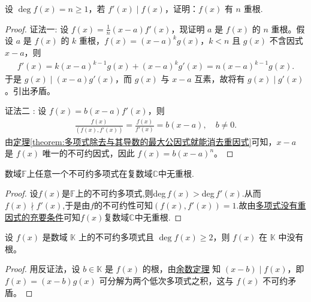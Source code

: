 \documentclass[../../main.tex]{subfiles}%
\begin{document}
\begin{proposition}\label{proposition:f有n重根的判断条件}
设 $\deg f(x) = n \geqslant  1$，若 $f'(x) \mid f(x)$，证明：$f(x)$ 有 $n$ 重根.
\end{proposition}
\begin{proof}

{\color{blue}证法一:}
设 $f(x) = \frac{1}{n}(x - a)f'(x)$，现证明 $a$ 是 $f(x)$ 的 $n$ 重根。假设 $a$ 是 $f(x)$ 的 $k$ 重根，$f(x) = (x - a)^k g(x)$，$k < n$ 且 $g(x)$ 不含因式 $x - a$，则
\begin{align*}
f'(x) = k(x - a)^{k-1}g(x) + (x - a)^k g'(x) = n(x - a)^{k-1}g(x).
\end{align*}
于是 $g(x) \mid (x - a)g'(x)$，而 $g(x)$ 与 $x - a$ 互素，故将有 $g(x) \mid g'(x)$。引出矛盾。

{\color{blue}证法二 :} 设 $f(x) =b(x - a)f'(x)$，则
\begin{align*}
\frac{f(x)}{(f(x), f'(x))} = \frac{f(x)}{f'(x)}  = b(x - a), \quad b \neq 0.
\end{align*}
由\hyperref[theorem:多项式除去与其导数的最大公因式就能消去重因式]{定理\ref{theorem:多项式除去与其导数的最大公因式就能消去重因式}}可知，$x - a$ 是 $f(x)$ 唯一的不可约因式，因此 $f(x) = b(x - a)^n$。
\end{proof}

\begin{proposition}
数域$\mathbb{F}$上任意一个不可约多项式在复数域$\mathbb{C}$中无重根.
\end{proposition}
\begin{proof}
设$f(x)$是$\mathbb{F}$上的不可约多项式,则deg$\,f(x)>$deg$\,f'(x)$.从而$f(x)\nmid f'(x)$,于是由$f$的不可约性可知$(f(x),f'(x))=1$.故由\hyperref[theorem:多项式没有重因式的充要条件]{多项式没有重因式的充要条件}可知$f(x)$复数域$\mathbb{C}$中无重根.
\end{proof}

\begin{lemma}\label{lemma:次数不为1得到不可约多项式没有根}
设 $f(x)$ 是数域 $\mathbb{K}$ 上的不可约多项式且 $\deg f(x) \geqslant  2$，则 $f(x)$ 在 $\mathbb{K}$ 中没有根。
\end{lemma}
\begin{proof}
用反证法，设 $b \in \mathbb{K}$ 是 $f(x)$ 的根，由\hyperref[theorem:余数定理]{余数定理} 知 $(x - b) \mid f(x)$，即 $f(x) = (x - b)g(x)$ 可分解为两个低次多项式之积，这与 $f(x)$ 不可约矛盾。
\end{proof}
\end{document}
